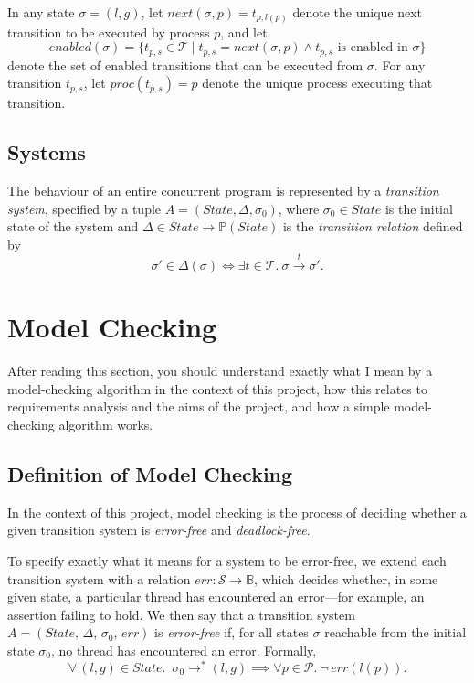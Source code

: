 \documentclass[12pt,a4paper,twoside,openright]{report}
\begin{document}
In any state $\sigma = (l, g)$, let
$\textit{next}(\sigma, p) = t_{p,l(p)}$ denote the unique next transition
to be executed by process $p$, and let
\[
	\textit{enabled}(\sigma) = \{t_{p,s} \in \mathcal{T} \mid
	t_{p,s} = \textit{next}(\sigma, p)
	\wedge t_{p,s} \text{ is enabled in } \sigma\}
\]
denote the set of enabled transitions that can be executed from $\sigma$.
For any transition $t_{p,s}$, let $\textit{proc}(t_{p,s}) = p$
denote the unique process executing that transition.

\subsection{Systems}
The behaviour of an entire concurrent program is represented by a
\emph{transition system},
specified by a tuple $A = (\textit{State}, \Delta, \sigma_0)$,
where $\sigma_0 \in \textit{State}$ is the initial state of the system and
$\Delta \in State \to \mathbb{P}(State)$
is the \emph{transition relation} defined by
\[
	\sigma' \in \Delta(\sigma) \iff
	\exists t \in \mathcal{T}. \ \sigma \xrightarrow{t} \sigma'.
\]

\section{Model Checking}
After reading this section, you should
understand exactly what I mean by a
model-checking algorithm in the context
of this project, how this relates to
requirements analysis and the aims
of the project, and how a simple
model-checking algorithm works.

\subsection{Definition of Model Checking}
\label{sec:model-checking-dfn}
In the context of this project,
model checking is the process of deciding
whether a
given transition system is \emph{error-free} and
\emph{deadlock-free}.

To specify exactly what it means for a system to
be error-free, we extend each transition system
with a relation
$\textit{err} : \mathcal{S} \to \mathbb{B}$, which decides
whether, in some given state, a particular
thread has encountered an error---for example,
an assertion failing to hold.
We then say that a transition system
$A = (\textit{State},\, \Delta,\, \sigma_0,\, \textit{err})$
is
\emph{error-free} if, for all
states $\sigma$ reachable from
the initial state $\sigma_0$, no thread
has encountered an error.
Formally,
\[
	\forall\, (l, g) \in \textit{State}.\; \ \sigma_0 \longrightarrow^* (l, g)
	\implies \forall p \in \mathcal{P}.\ \neg\,\textit{err}(l(p)).
\]
\end{document}
